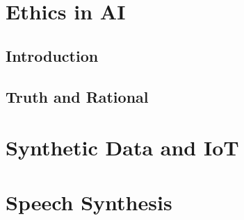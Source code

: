 \documentclass[11pt,fleqn]{book} %
\begin{document}
\part{Ethics in AI}


\chapter{Introduction}
\chapter{Truth and Rational}


\part{Synthetic Data and IoT}



\part{Speech Synthesis}


\end{document}

